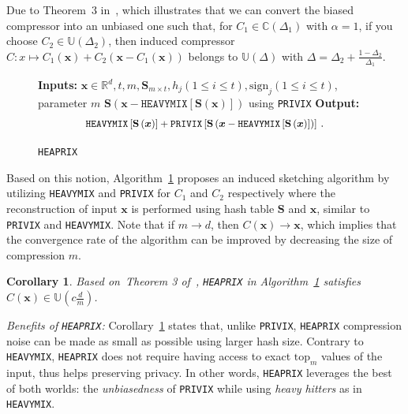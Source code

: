 \documentclass[11pt]{article}
\newtheorem{corollary}{Corollary}
\newcommand*{\Resize}[2]{\resizebox{#1}{!}{$#2$}}%
\begin{document}
Due to Theorem~$3$ in~\citet{horvath2020better}, which illustrates that we can convert the biased compressor into an unbiased one such that, for $C_1\in \mathbb{C}(\Delta_1)$ with $\alpha=1$, if you choose $C_2\in \mathbb{U}(\Delta_2)$, then induced compressor $C: x \mapsto C_1(\mathbf{x})+C_2\left(\mathbf{x}-C_1\left(\mathbf{x}\right)\right)$ belongs to $\mathbb{U}(\Delta)$ with $\Delta=\Delta_2+\frac{1-\Delta_2}{\Delta_1}$. 
\begin{figure}\vspace{-0.7cm}
\begin{minipage}{\linewidth}
\begin{algorithm}[H]
\caption{\texttt{HEAPRIX} }\label{alg:heaprix}
\begin{algorithmic}[1]
\STATE \textbf{Inputs:} $\boldsymbol{x}\in\mathbb{R}^{d}, t, m, \mathbf{S}_{m\times t}, h_j (1\leq i\leq t), \text{sign}_j (1\leq i\leq t)$, parameter $m$
 $\mathbf{S}\left(\boldsymbol{x} - \texttt{HEAVYMIX}[\mathbf{S}(\boldsymbol{x})]\right)$ using \texttt{PRIVIX} 
\STATE \textbf{Output:}
\vspace{- 0.1cm}
\[ \Resize{7.4cm}{\texttt{HEAVYMIX}\left[\mathbf{S}\left(\boldsymbol{x}\right)\right]+\texttt{PRIVIX}\left[\mathbf{S}\left(\boldsymbol{x}-\texttt{HEAVYMIX}\left[\mathbf{S}\left(\boldsymbol{x}\right)\right]\right)\right]}\ .\]
\end{algorithmic}
\end{algorithm}
\vspace{-0.1in}
\end{minipage}\end{figure}
Based on this notion, Algorithm~\ref{alg:heaprix} proposes an induced sketching algorithm by utilizing \texttt{HEAVYMIX} and \texttt{PRIVIX} for $C_1$ and $C_2$ respectively where the reconstruction of input $\mathbf{x}$ is performed using hash table $\mathbf{S}$ and $\mathbf{x}$, similar to \texttt{PRIVIX} and \texttt{HEAVYMIX}.
Note that if $m\rightarrow d$, then $C(\boldsymbol{x})\rightarrow \boldsymbol{x}$, which implies that the convergence rate of the algorithm can be improved by decreasing the size of compression $m$. 
\begin{corollary}\label{cor:small}
Based on~Theorem 3 of~\citep{horvath2020better}, \texttt{HEAPRIX} in Algorithm~\ref{alg:heaprix} satisfies $C(\boldsymbol{x})\in \mathbb{U}(c \frac{d}{m})$. 
\end{corollary}
\textit{Benefits of \texttt{HEAPRIX}:} Corollary~\ref{cor:small} states that, unlike \texttt{PRIVIX}, \texttt{HEAPRIX} compression noise can be made as small as possible using larger hash size. 
Contrary to \texttt{HEAVYMIX}, \texttt{HEAPRIX} does not require having access to exact $\text{top}_m$ values of the input, thus helps preserving privacy. 
In other words, \texttt{HEAPRIX} leverages the best of both worlds: the \emph{unbiasedness} of \texttt{PRIVIX} while using \emph{heavy hitters} as in \texttt{HEAVYMIX}.
\end{document}
